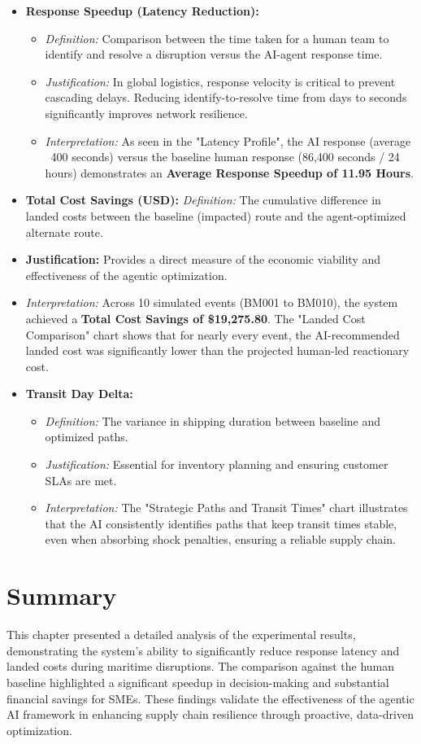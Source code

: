 \begin{itemize}
    \item \textbf{Response Speedup (Latency Reduction):}
    \begin{itemize}
        \item \textit{Definition:} Comparison between the time taken for a human team to identify and resolve a disruption versus the AI-agent response time.
        \item \textit{Justification:} In global logistics, response velocity is critical to prevent cascading delays. Reducing identify-to-resolve time from days to seconds significantly improves network resilience.
        \item \textit{Interpretation:} As seen in the "Latency Profile", the AI response (average ~400 seconds) versus the baseline human response (86,400 seconds / 24 hours) demonstrates an \textbf{Average Response Speedup of 11.95 Hours}.
    \end{itemize}
    \item \textbf{Total Cost Savings (USD):}
    \textit{Definition:} The cumulative difference in landed costs between the baseline (impacted) route and the agent-optimized alternate route.
    \item \textbf{Justification:} Provides a direct measure of the economic viability and effectiveness of the agentic optimization.
    \item \textit{Interpretation:} Across 10 simulated events (BM001 to BM010), the system achieved a \textbf{Total Cost Savings of \$19,275.80}. The "Landed Cost Comparison" chart shows that for nearly every event, the AI-recommended landed cost was significantly lower than the projected human-led reactionary cost.
    \item \textbf{Transit Day Delta:}
    \begin{itemize}
        \item \textit{Definition:} The variance in shipping duration between baseline and optimized paths.
        \item \textit{Justification:} Essential for inventory planning and ensuring customer SLAs are met.
        \item \textit{Interpretation:} The "Strategic Paths and Transit Times" chart illustrates that the AI consistently identifies paths that keep transit times stable, even when absorbing shock penalties, ensuring a reliable supply chain.
    \end{itemize}
\end{itemize}

\section[Summary]{Summary}
This chapter presented a detailed analysis of the experimental results, demonstrating the system's ability to significantly reduce response latency and landed costs during maritime disruptions. The comparison against the human baseline highlighted a significant speedup in decision-making and substantial financial savings for SMEs. These findings validate the effectiveness of the agentic AI framework in enhancing supply chain resilience through proactive, data-driven optimization.
